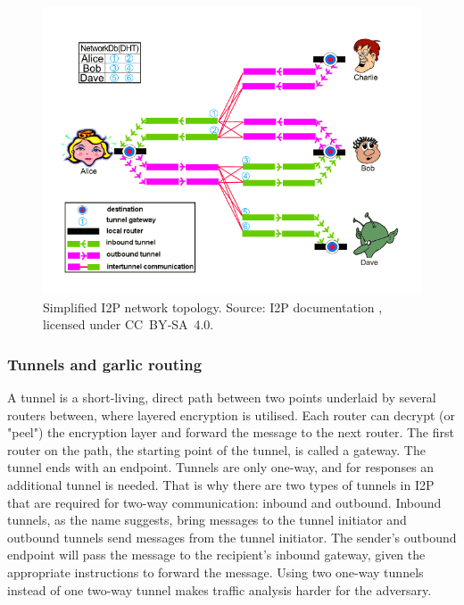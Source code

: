 \begin{figure}[ht]
  \centering
  \includegraphics[width=0.75\linewidth]{Images/i2p.png}
  \caption{Simplified I2P network topology. Source: I2P documentation \cite{i2p-topology}, licensed under CC BY‑SA 4.0.}
  \label{fig:i2p-topology}
\end{figure}

\subsubsection{Tunnels and garlic routing}
A tunnel is a short-living, direct path between two points underlaid by several routers between, where layered encryption is utilised. Each router can decrypt (or "peel") the encryption layer and forward the message to the next router. The first router on the path, the starting point of the tunnel, is called a gateway. The tunnel ends with an endpoint. Tunnels are only one-way, and for responses an additional tunnel is needed. That is why there are two types of tunnels in I2P that are required for two-way communication: inbound and outbound. Inbound tunnels, as the name suggests, bring messages to the tunnel initiator and outbound tunnels send messages from the tunnel initiator. The sender’s outbound endpoint will pass the message to the recipient's inbound gateway, given the appropriate instructions to forward the message. Using two one-way tunnels instead of one two-way tunnel makes traffic analysis harder for the adversary.

